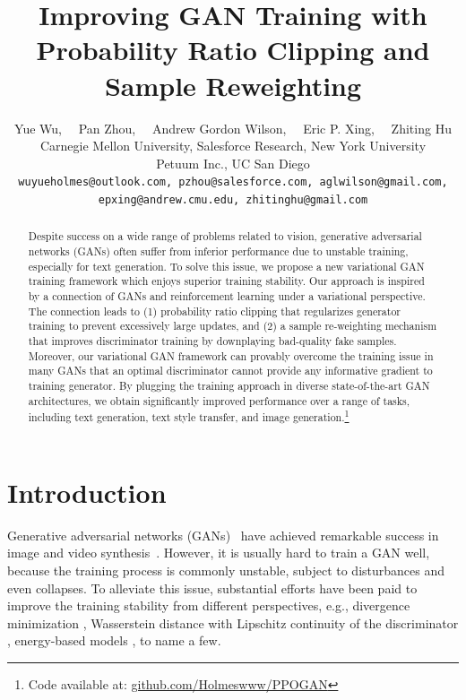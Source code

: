 \documentclass{article}
\title{Improving GAN Training with Probability Ratio Clipping and Sample Reweighting}
\author{Yue Wu,~~ Pan Zhou,~~ Andrew Gordon Wilson,~~ Eric P. Xing,~~ Zhiting Hu \\
	Carnegie Mellon University, Salesforce Research, New York University\\
	Petuum Inc., UC San Diego\\
	{ \texttt \tt wuyueholmes@outlook.com,}\ {\texttt \tt pzhou@salesforce.com,}\ {\texttt\tt aglwilson@gmail.com,}\\ 
	{\texttt \tt epxing@andrew.cmu.edu,}\ {\texttt \tt zhitinghu@gmail.com}
}
\newcommand{\0}{\bm{0}}
\begin{document}
\newtheorem{claim}{Claim}[section]
\newtheorem{prop}{Proposition}[section]
\newenvironment{psketch}{\renewcommand{\proofname}{Proof sketch}\proof}{\endproof}
\maketitle
  


\begin{abstract}
Despite success on a wide range of problems related to vision, generative adversarial networks (GANs) often suffer from inferior performance due to unstable training, especially for text generation. To solve this issue, we propose a new variational GAN training framework which enjoys superior  training stability. Our approach is inspired by a connection of GANs and reinforcement learning under a variational perspective. The connection leads to (1) probability ratio clipping that regularizes generator training to prevent excessively large updates, and (2) a sample re-weighting mechanism that improves discriminator training by downplaying bad-quality fake samples.  Moreover, our  variational GAN framework  can provably overcome the training issue in many GANs that an optimal discriminator cannot provide any  informative gradient to training generator. 
By plugging the training approach in diverse state-of-the-art GAN architectures, we obtain significantly improved performance over a range of tasks, including text generation, text style transfer, and image generation.\footnote{Code available at: \href{https://github.com/Holmeswww/PPOGAN}{github.com/Holmeswww/PPOGAN}}







\end{abstract}

\section{Introduction}
\label{sec:intro}
Generative adversarial networks (GANs)~\citep{goodfellow2014generative} have achieved remarkable success in image and video synthesis~\cite{DCGAN,brock2018large,mathieu2015deep}. However, it is usually hard to train a GAN well, because the training process is commonly unstable, subject to disturbances and even collapses. 
To alleviate this issue, substantial efforts have been paid to improve the training stability from different perspectives, 
e.g., divergence minimization \cite{nowozin2016f,nock2017f}, Wasserstein distance with Lipschitz continuity of the discriminator \cite{WGAN,wgangp,wwgan}, energy-based models \cite{zhao2016energy,berthelot2017began}, to name a few. 
\end{document}
